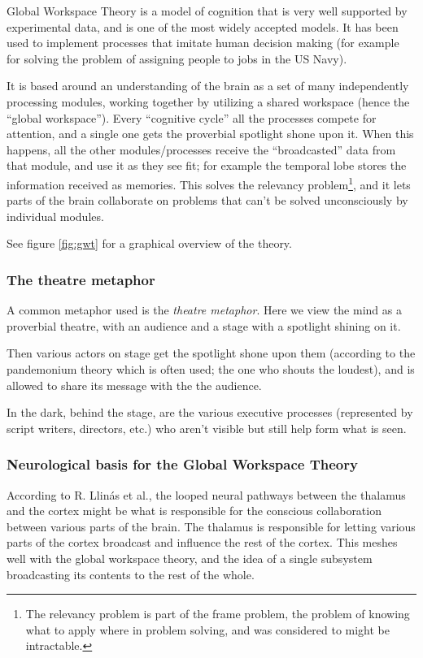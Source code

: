 Global Workspace Theory is a model of cognition that is very well supported by experimental data, and is one of the most widely accepted models. \cite{dehaene2001towards} It has been used to implement processes that imitate human decision making (for example for solving the problem of assigning people to jobs in the US Navy).\cite{baars2005gwt}\cite{franklin2003interacting}

It is based around an understanding of the brain as a set of many independently processing modules, working together by utilizing a shared workspace (hence the ``global workspace''). Every ``cognitive cycle'' all the processes compete for attention, and a single one gets the proverbial spotlight shone upon it.\cite{baars2005gwt} When this happens, all the other modules/processes receive the ``broadcasted'' data from that module, and use it as they see fit; for example the temporal lobe stores the information received as memories. This solves the relevancy problem\footnote{The relevancy problem is part of the frame problem, the problem of knowing what to apply where in problem solving, and was considered to might be intractable.\cite{shanahan2005applying}}, and it lets parts of the brain collaborate on problems that can't be solved unconsciously by individual modules.

See figure \ref{fig:gwt} for a graphical overview of the theory.

\subsubsection{The theatre metaphor}
A common metaphor used is the {\em theatre metaphor}. Here we view the mind as a proverbial theatre, with an audience and a stage with a spotlight shining on it.

Then various actors on stage get the spotlight shone upon them (according to the pandemonium theory which is often used; the one who shouts the loudest\cite{selfridge1958pandemonium}), and is allowed to share its message with the the audience.

In the dark, behind the stage, are the various executive processes (represented by script writers, directors, etc.) who aren't visible but still help form what is seen.

\subsubsection{Neurological basis for the Global Workspace Theory}
According to R. Llinás et al.\cite{llinas1998neuronal}, the looped neural pathways between the thalamus and the cortex might be what is responsible for the conscious collaboration between various parts of the brain. The thalamus is responsible for letting various parts of the cortex broadcast and influence the rest of the cortex. This meshes well with the global workspace theory, and the idea of a single subsystem broadcasting its contents to the rest of the whole.

